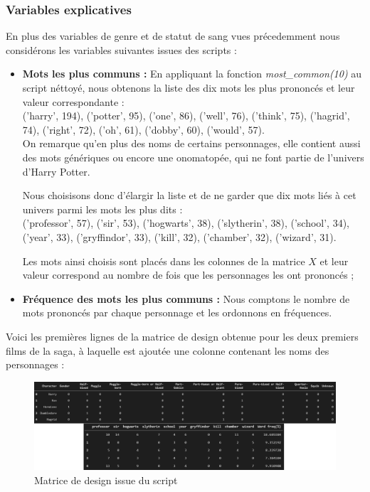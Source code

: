 \documentclass[11pt]{article}
\begin{document}
\begin{center}
\subsubsection{Variables explicatives}

En plus des variables de genre et de statut de sang vues précedemment nous considérons les variables suivantes issues des scripts : 

\begin{itemize}
    \renewcommand{\labelitemi}{$\bullet$}
    \item \textbf{Mots les plus communs :} En appliquant la fonction \textit{most\_common(10)} au script néttoyé, nous obtenons la liste des dix mots les plus prononcés et leur valeur correspondante :\\
    ('harry', 194), ('potter', 95), ('one', 86), ('well', 76), ('think', 75), ('hagrid', 74), ('right', 72), ('oh', 61), ('dobby', 60), ('would', 57).\\
    On remarque qu'en plus des noms de certains personnages, elle contient aussi des mots génériques ou encore une onomatopée, qui ne font partie de l'univers d'Harry Potter.\par
    Nous choisisons donc d'élargir la liste et de ne garder que dix mots liés à cet univers parmi les mots les plus dits :\\
    ('professor', 57), ('sir', 53), ('hogwarts', 38), ('slytherin', 38), ('school', 34), ('year', 33), ('gryffindor', 33), ('kill', 32), ('chamber', 32), ('wizard', 31).
    
    Les mots ainsi choisis sont placés dans les colonnes de la matrice $X$ et leur valeur correspond au nombre de fois que les personnages les ont prononcés ;

    \item \textbf{Fréquence des mots les plus communs :} Nous comptons le nombre de mots prononcés par chaque personnage et les ordonnons en fréquences.

\end{itemize}

Voici les premières lignes de la matrice de design obtenue pour les deux premiers films de la saga, à laquelle est ajoutée une colonne contenant les noms des personnages :

\begin{figure}[hbt!]
    \centering
    \includegraphics[width= 15.5 cm]{./figures/design.png}
    \caption{Matrice de design issue du script}
\end{figure}


\end{center}
\end{document}
